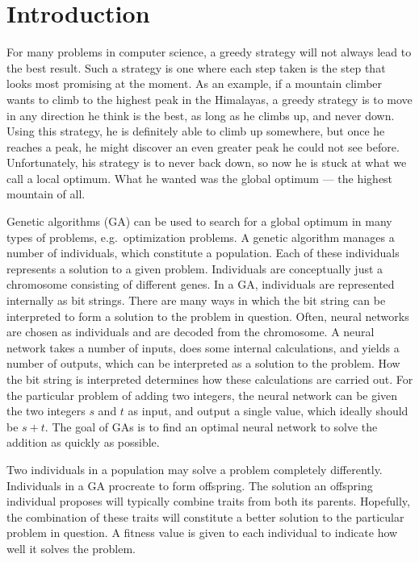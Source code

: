 \section{Introduction}
For many problems in computer science, a greedy strategy will not always lead to the best result. Such a strategy is one where each step taken is the step that looks most promising at the moment. As an example, if a mountain climber wants to climb to the highest peak in the Himalayas, a greedy strategy is to move in any direction he think is the best, as long as he climbs up, and never down. Using this strategy, he is definitely able to climb up somewhere, but once he reaches a peak, he might discover an even greater peak he could not see before. Unfortunately, his strategy is to never back down, so now he is stuck at what we call a local optimum. What he wanted was the global optimum --- the highest mountain of all.
 
Genetic algorithms (GA) can be used to search for a global optimum in many types of problems, e.g.\ optimization problems. A genetic algorithm manages a number of individuals, which constitute a population. Each of these individuals represents a solution to a given problem. Individuals are conceptually just a chromosome consisting of different genes. In a GA, individuals are represented internally as bit strings. There are many ways in which the bit string can be interpreted to form a solution to the problem in question. Often, neural networks are chosen as individuals and are decoded from the chromosome. A neural network takes a number of inputs, does some internal calculations, and yields a number of outputs, which can be interpreted as a solution to the problem. How the bit string is interpreted determines how these calculations are carried out. For the particular problem of adding two integers, the neural network can be given the two integers $s$ and $t$ as input, and output a single value, which ideally should be $s+t$. The goal of GAs is to find an optimal neural network to solve the addition as quickly as possible.

Two individuals in a population may solve a problem completely differently. Individuals in a GA procreate to form offspring. The solution an offspring individual proposes will typically combine traits from both its parents. Hopefully, the combination of these traits will constitute a better solution to the particular problem in question. A fitness value is given to each individual to indicate how well it solves the problem.

